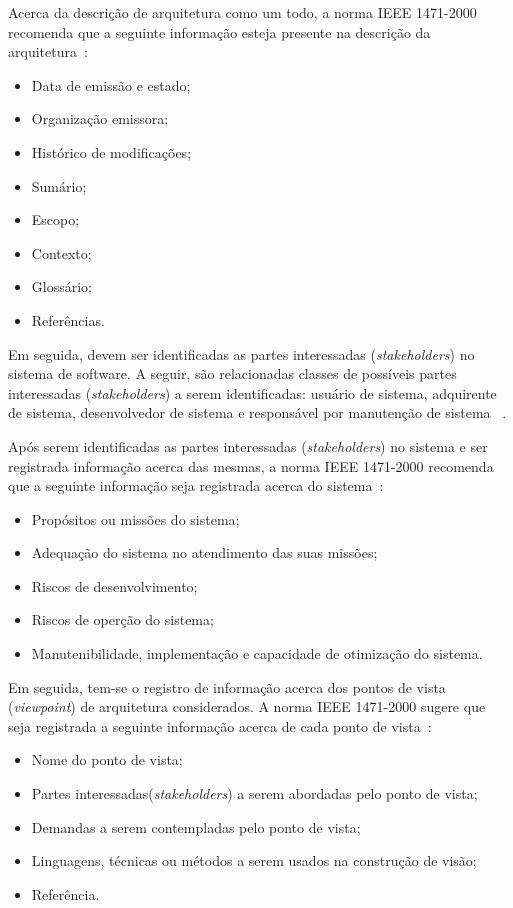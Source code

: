 Acerca da descrição de arquitetura como um todo, a norma IEEE 1471-2000 recomenda que a seguinte informação esteja presente na descrição da arquitetura~\cite{ISO_1471}:

\begin{itemize}
    \item Data de emissão e estado;
    \item Organização emissora;
    \item Histórico de modificações;
    \item Sumário;
    \item Escopo;
    \item Contexto;
    \item Glossário;
    \item Referências.
\end{itemize}

Em seguida, devem ser identificadas as partes interessadas (\emph{stakeholders}) no sistema de software. A seguir, são relacionadas classes de possíveis partes interessadas (\emph{stakeholders}) a serem identificadas: usuário de sistema, adquirente de sistema, desenvolvedor de sistema e responsável por manutenção de sistema ~\cite{ISO_1471}.

Após serem identificadas as partes interessadas (\emph{stakeholders}) no sistema e ser registrada informação acerca das mesmas, a norma IEEE 1471-2000  recomenda que a seguinte informação seja registrada acerca do sistema~\cite{ISO_1471}:

\begin{itemize}
    \item Propósitos ou missões do sistema;
    \item Adequação do sistema no atendimento das suas missões;
    \item Riscos de desenvolvimento;
    \item Riscos de operção do sistema;
    \item Manutenibilidade, implementação e capacidade de otimização do sistema.
\end{itemize}

Em seguida, tem-se o registro de informação acerca dos pontos de vista (\emph{viewpoint}) de arquitetura considerados. A norma IEEE 1471-2000 sugere que seja registrada a seguinte informação acerca de cada ponto de vista~\cite{ISO_1471}:

\begin{itemize}
    \item Nome do ponto de vista;
    \item Partes interessadas(\emph{stakeholders}) a serem abordadas pelo ponto de vista;
    \item Demandas a serem contempladas pelo ponto de vista;
    \item Linguagens, técnicas ou métodos a serem usados na construção de visão;
    \item Referência.
\end{itemize}

